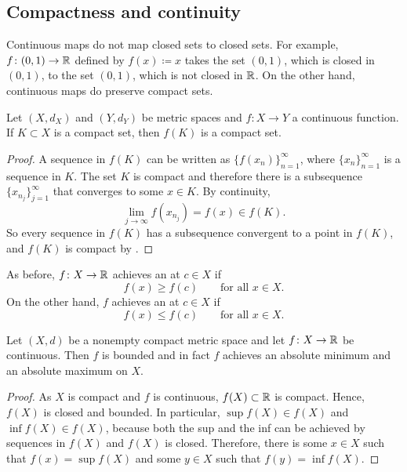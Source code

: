 \subsection{Compactness and continuity}

Continuous maps do not map closed sets to closed sets.  For example,
$f \colon (0,1) \to {\mathbb{R}}$ defined by $f(x) \coloneqq x$ takes the set $(0,1)$, which
is closed in $(0,1)$, to the set $(0,1)$, which is not closed in ${\mathbb{R}}$.
On the other hand, continuous maps do preserve compact sets.

\begin{lemma} \label{lemma:continuouscompact}
Let $(X,d_X)$ and $(Y,d_Y)$ be metric spaces
and $f \colon X \to Y$ a continuous function.  If
$K \subset X$ is a compact set, then $f(K)$ is a compact set.
\end{lemma}

\begin{proof}
A sequence in $f(K)$ can be written as
$\bigl\{ f(x_n) \bigr\}_{n=1}^\infty$, where
$\{ x_n \}_{n=1}^\infty$ is a sequence in $K$.  The set $K$ is compact and
therefore there is a subsequence
$\{ x_{n_j} \}_{j=1}^\infty$ that converges to some $x \in K$.
By continuity,
\begin{equation*}
\lim_{j\to\infty} f(x_{n_j}) = f(x) \in f(K) .
\end{equation*}
So every sequence in $f(K)$ has a subsequence convergent to 
a point in $f(K)$, and $f(K)$ is compact by .
\end{proof}

As before, $f \colon X \to {\mathbb{R}}$ achieves an
\emph{} at $c \in X$ if
\begin{equation*}
f(x) \geq f(c) \qquad \text{for all } x \in X.
\end{equation*}
On the other hand, $f$ achieves an 
\emph{} at $c \in X$ if
\begin{equation*}
f(x) \leq f(c) \qquad \text{for all } x \in X.
\end{equation*}

\begin{thm}
Let $(X,d)$ be a nonempty compact metric space
and let $f \colon X \to {\mathbb{R}}$ be continuous.  Then
$f$ is bounded and in fact
$f$ achieves an absolute minimum and an absolute maximum on $X$.
\end{thm}

\begin{proof}
As $X$ is compact and $f$ is continuous,
$f(X) \subset {\mathbb{R}}$ is compact.  Hence, $f(X)$ is closed
and bounded.  In particular,
$\sup f(X) \in f(X)$ and
$\inf f(X) \in f(X)$, because both the sup and the inf
can be achieved by sequences in $f(X)$ and $f(X)$ is closed.
Therefore, there is some $x \in X$ such that $f(x) = \sup f(X)$
and some $y \in X$ such that $f(y) = \inf f(X)$.
\end{proof}

